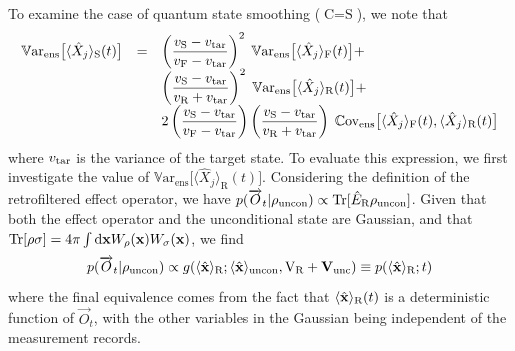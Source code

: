 \documentclass[aps,prx,onecolumn,superscriptaddress,floatfix,longbibliography,amsmath,amssymb]{revtex4-2}
\newcommand{\fil}{_{\text F}}
\newcommand{\rfil}{_{\text R}}
\newcommand{\sm}{_{\text S}}
\newcommand{\tar}{_{\rm tar}}
\newcommand{\dd}{{\rm d}}
\newcommand{\bx}{\hat{\bf x}}
\newcommand{\ex}[1]{\langle #1 \rangle}
\newcommand{\fut}[1]{\overrightarrow{#1}}
\newcommand{\Tr}{{\rm Tr}}
\newcommand{\beq}{\begin{equation}}
\newcommand{\eeq}{\end{equation}}
\newcommand{\cya}{\color{ncyan}}
\begin{document}
To examine the case of quantum state smoothing ($\text{C}=\text{S}$), we note that
\begin{equation}
\begin{array}{rcl}
    \mathbb{V}\text{ar}_{\text{ens}}\big[\langle\hat{X}_j\rangle_\text{S}(t)\big] & = & \left(\dfrac{v\sm-v\tar}{v\fil-v\tar}\right)^2\;\mathbb{V}\text{ar}_{\text{ens}}\big[\langle\hat{X}_j\rangle_\text{F}(t)\big]+\\&&\left(\dfrac{v\sm-v\tar}{v\rfil+v\tar}\right)^2\;\mathbb{V}\text{ar}_{\text{ens}}\big[\langle\hat{X}_j\rangle_\text{R}(t)\big]+\\&&
    2\left(\dfrac{v\sm-v\tar}{v\fil-v\tar}\right)\left(\dfrac{v\sm-v\tar}{v\rfil+v\tar}\right)\;
    \mathbb{C}\text{ov}_{\text{ens}}\big[\langle\hat{X}_j\rangle_\text{F}(t),\langle\hat{X}_j\rangle_\text{R}(t)\big]
    \label{equ:VarX_S}
\end{array}
\end{equation}
where $v\tar$ is the variance of the target state. To evaluate this expression, we first investigate the value of $\mathbb{V}\text{ar}_{\text{ens}}\big[\langle\hat{X}_j\rangle_\text{R}(t)\big]$.
Considering the definition of the retrofiltered effect operator, we have $p(\fut{O}_t|\rho_{\rm uncon}) \propto \Tr[\hat E\rfil\rho_{\rm uncon}]$. Given that both the effect operator and the unconditional state are Gaussian, and that $\Tr[\rho\sigma] = 4\pi\int\dd{\bf x} W_{\rho}({\bf x})W_{\sigma}({\bf x})$, we find 
\beq
p(\fut{O}_t|\rho_{\rm uncon}) \propto g(\ex{\bx}\rfil;\ex{\bx}_{\rm uncon}, {\rm V}\rfil + {\bf V}_{\rm unc})\equiv p(\ex{\bx}\rfil;t)
\eeq
where the final equivalence comes from the fact that $\ex{\bx}\rfil(t)$ is a deterministic function of $\fut{O}_t$, with the other variables in the Gaussian being independent of the measurement records.
\end{document}
